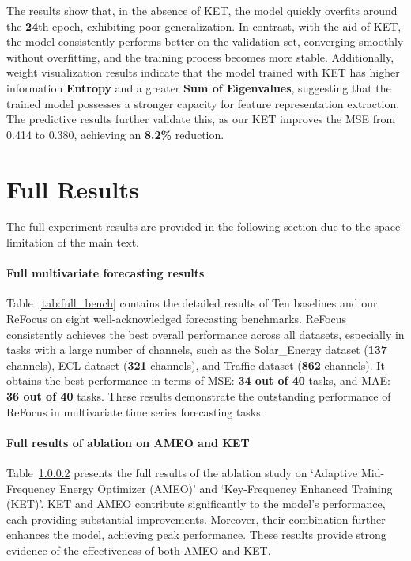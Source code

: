 The results show that, in the absence of KET, the model quickly overfits around the \textbf{24}th epoch, exhibiting poor generalization. In contrast, with the aid of KET, the model consistently performs better on the validation set, converging smoothly without overfitting, and the training process becomes more stable. Additionally, weight visualization results indicate that the model trained with KET has higher information \textbf{Entropy} and a greater \textbf{Sum of Eigenvalues}, suggesting that the trained model possesses a stronger capacity for feature representation extraction. The predictive results further validate this, as our KET improves the MSE from 0.414 to 0.380, achieving an \textbf{8.2\%} reduction.

\section{Full Results}
\label{app:full results}

The full experiment results are provided in the following section due to the space limitation of the main text. 

\paragraph{Full multivariate forecasting results }
\label{app:full bench}
Table~\ref{tab:full_bench} contains the detailed results of Ten baselines and our ReFocus on eight well-acknowledged forecasting benchmarks. ReFocus consistently achieves the best overall performance across all datasets, especially in tasks with a large number of channels, such as the Solar\_Energy dataset (\textbf{137} channels), ECL dataset (\textbf{321} channels), and Traffic dataset (\textbf{862} channels). It obtains the best performance in terms of MSE: \textbf{34 out of 40} tasks, and MAE: \textbf{36 out of 40} tasks. These results demonstrate the outstanding performance of ReFocus in multivariate time series forecasting tasks.


\paragraph{Full results of ablation on AMEO and KET }  
\label{app:full ablation}
Table~\ref{app:full ablation} presents the full results of the ablation study on `Adaptive Mid-Frequency Energy Optimizer (AMEO)' and `Key-Frequency Enhanced Training (KET)'. KET and AMEO contribute significantly to the model's performance, each providing substantial improvements. Moreover, their combination further enhances the model, achieving peak performance. These results provide strong evidence of the effectiveness of both AMEO and KET.


